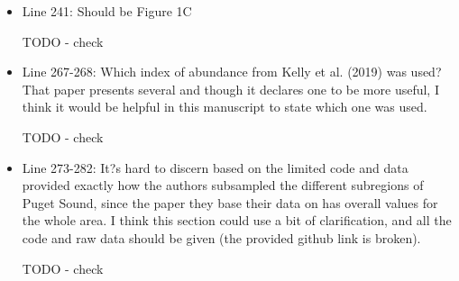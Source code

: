 \documentclass[11pt]{article}
\begin{document}
\begin{linenumbers}
\begin{itemize}
\item{Line 241: Should be Figure 1C}

{\color{red} TODO - check }


\item{Line 267-268: Which index of abundance from Kelly et al. (2019) was used? That paper presents several and though it declares one to be more useful, I think it would be helpful in this manuscript to state which one was used.}

{\color{red} TODO - check }


\item{Line 273-282: It?s hard to discern based on the limited code and data provided exactly how the authors subsampled the different subregions of Puget Sound, since the paper they base their data on has overall values for the whole area. I think this section could use a bit of clarification, and all the code and raw data should be given (the provided github link is broken).}

{\color{red} TODO - check }


\end{itemize}
 \end{linenumbers}
\end{document}

